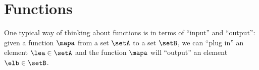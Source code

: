

\section{Functions}
\label{sec:functions}


One typical way of thinking about functions is in terms of ``input'' and ``output'': given a function $\mapa$ from a set $\setA$ to a set $\setB$, we can ``plug in'' an element $\lea \in \setA$ and the function $\mapa$ will ``output'' an element $\elb \in \setB$. 






\clearpage
